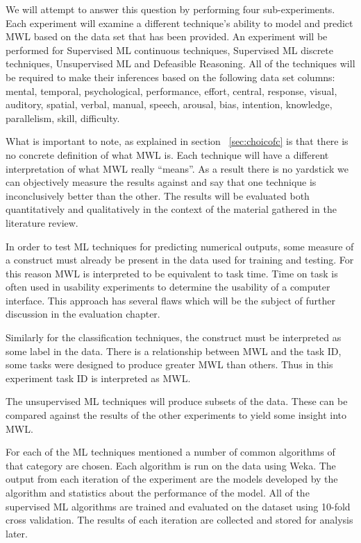 We will attempt to answer this question by performing four sub-experiments. Each experiment will examine a different technique's ability to model and predict MWL based on the data set that has been provided. An experiment will be performed for Supervised ML continuous techniques, Supervised ML discrete techniques, Unsupervised ML and Defeasible Reasoning. All of the techniques will be required to make their inferences based on the following data set columns: mental, temporal, psychological, performance, effort, central, response, visual, auditory, spatial, verbal, manual, speech, arousal, bias, intention, knowledge, parallelism, skill, difficulty. 

What is important to note, as explained in section ~\ref{sec:choicofc} is that there is no concrete definition of what MWL is. Each technique will have a different interpretation of what MWL really ``means''. As a result there is no yardstick we can objectively measure the results against and say that one technique is inconclusively better than the other. The results will be evaluated both quantitatively and qualitatively in the context of the material gathered in the literature review.

In order to test ML techniques for predicting numerical outputs, some measure of a construct must already be present in the data used for training and testing. For this reason MWL is interpreted to be equivalent to task time. Time on task is often used in usability experiments to determine the usability of a computer interface. This approach has several flaws which will be the subject of further discussion in the evaluation chapter.

Similarly for the classification techniques, the construct must be interpreted as some label in the data. There is a relationship between MWL and the task ID, some tasks were designed to produce greater MWL than others. Thus in this experiment task ID is interpreted as MWL.

The unsupervised ML techniques will produce subsets of the data. These can be compared against the results of the other experiments to yield some insight into MWL.

For each of the ML techniques mentioned a number of common algorithms of that category are chosen. Each algorithm is run on the data using Weka. The output from each iteration of the experiment are the models developed by the algorithm and statistics about the performance of the model. All of the supervised ML algorithms are trained and evaluated on the dataset using 10-fold cross validation. The results of each iteration are collected and stored for analysis later.

